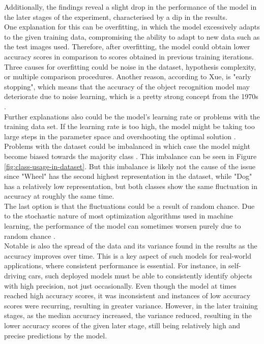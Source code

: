 
Additionally, the findings reveal a slight drop in the performance of the model in the later stages of the experiment, 
characterised by a dip in the results.\\

One explanation for this can be overfitting, in which the model excessively adapts to the given training data, compromising the ability to 
adapt to new data such as the test images used. Therefore, after overfitting, the model could obtain lower accuracy scores in comparison 
to scores obtained in previous training iterations. Three causes for overfitting could be noise in the dataset, 
hypothesis complexity, or multiple comparison procedures. Another reason, according to Xue, is "early stopping",
which means that the accuracy of the object recognition model may deteriorate due to noise learning,
which is a pretty strong concept from the 1970s \parencite[1--2]{Xue2019}.\\

Further explanations also could be the model's learning rate or problems with the training data set. If the learning rate is too high, the
model might be taking too large steps in the parameter space and overshooting the optimal solution \parencite{GreatLearningTeam2020}.
Problems with the dataset could be imbalanced in which case the model might become biased towards the majority class \parencite{Brownlee2019a}. 
This imbalance can be seen in Figure \ref{fig:class-usage-in-dataset}. But this imbalance is likely not the cause of the issue since 
"Wheel" has the second highest representation in the dataset, while "Dog" has a relatively low representation, but both classes show the same 
fluctuation in accuracy at roughly the same time.\\

The last option is that the fluctuations could be a result of random chance. Due to the stochastic nature of most optimization algorithms
used in machine learning, the performance of the model can sometimes worsen purely due to random chance \parencite{Brownlee2021}. \\


Notable is also the spread of the data and its variance found in the results as the accuracy improves over time. This is a key aspect of such models for real-world applications, where consistent performance is essential. For instance, in self-driving cars, such deployed models must be able to consistently identify objects with high precision, not just occasionally. Even though the model at times reached high accuracy scores, it was inconsistent and instances of low accuracy scores were recurring, resulting in greater variance. However, in the later training stages,  as the median accuracy increased, the variance reduced, resulting in the lower accuracy scores of the given later stage, still being relatively high and precise predictions by the model.    \\

